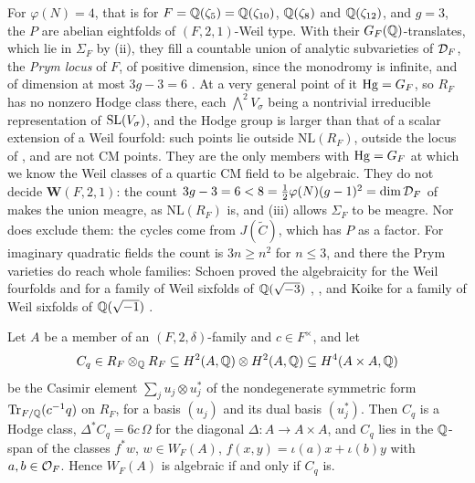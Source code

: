\begin{remark}
For $\varphi(N)=4$, that is for $F=\mathbb{Q}(\zeta_{5})=\mathbb{Q}(\zeta_{10})$,
$\mathbb{Q}(\zeta_{8})$ and $\mathbb{Q}(\zeta_{12})$, and $g=3$, the $P$ are abelian
eightfolds of $(F,2,1)$-Weil type. With their $G_{F}(\mathbb{Q})$-translates, which
lie in $\Sigma_{F}$ by (ii), they fill a countable
union of analytic subvarieties of $\mathcal{D}_{F}$, the \emph{Prym locus} of $F$, of
positive dimension, since the monodromy is infinite, and of dimension at most
$3g-3=6$ \cite[pp.~25--26]{Sch88}. At a very general point of it $\operatorname{Hg}=G_{F}$, so
$R_{F}$ has no nonzero Hodge class there, each $\bigwedge^{2}V_{\sigma}$ being
a nontrivial irreducible representation of $\operatorname{SL}(V_{\sigma})$, and the Hodge
group is larger than that of a scalar extension of a Weil fourfold: such
points lie outside $\mathrm{NL}(R_{F})$, outside the locus of
, and are not CM points. They are the only members
with $\operatorname{Hg}=G_{F}$ at which we know the Weil classes of a quartic CM field to be
algebraic. They do not decide $\mathbf{W}(F,2,1)$: the count
$3g-3=6<8=\tfrac12\varphi(N)(g-1)^{2}=\dim\mathcal{D}_{F}$ of \cite[pp.~25--26]{Sch88}
makes the union meagre, as $\mathrm{NL}(R_{F})$ is, and
(iii) allows $\Sigma_{F}$ to be meagre. Nor does
 exclude them: the cycles come from $J(\widetilde C)$,
which has $P$ as a factor. For imaginary quadratic fields the count is
$3n\ge n^{2}$ for $n\le3$, and there the Prym varieties do reach whole
families: Schoen proved the algebraicity for the Weil fourfolds and for a
family of Weil sixfolds of $\mathbb{Q}(\sqrt{-3})$ \cite[Theorem~3.2]{Sch88},
\cite{Sch98}, and Koike for a family of Weil sixfolds of $\mathbb{Q}(\sqrt{-1})$
\cite[Theorem~2.1, Corollary~2.1]{Koi04}.
\end{remark}

\begin{proposition}\label{prop:quarticcasimir}
Let $A$ be a member of an $(F,2,\delta)$-family and $c\in F^{\times}$, and let
\[
  C_{q}\in R_{F}\otimes_{\mathbb{Q}}R_{F}\subseteq H^{2}(A,\mathbb{Q})\otimes H^{2}(A,\mathbb{Q})
  \subseteq H^{4}(A\times A,\mathbb{Q})
\]
be the Casimir element $\sum_{j}u_{j}\otimes u_{j}^{*}$ of the nondegenerate
symmetric form $\operatorname{Tr}_{F/\mathbb{Q}}(c^{-1}q)$ on $R_{F}$, for a basis $(u_{j})$ and its
dual basis $(u_{j}^{*})$. Then $C_{q}$ is a Hodge class,
$\Delta^{*}C_{q}=6c\,\Omega$ for the diagonal $\Delta\colon A\to A\times A$,
and $C_{q}$ lies in the $\mathbb{Q}$-span of the classes $f^{*}w$, $w\in W_{F}(A)$,
$f(x,y)=\iota(a)x+\iota(b)y$ with $a,b\in\mathcal{O}_{F}$. Hence $W_{F}(A)$ is
algebraic if and only if $C_{q}$ is.
\end{proposition}

